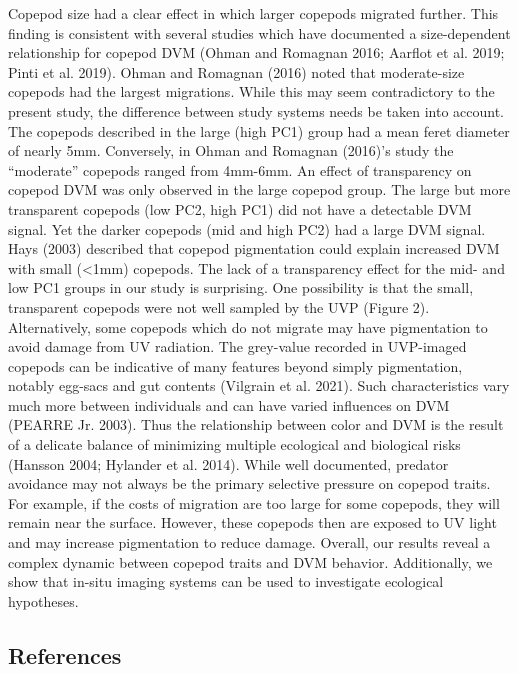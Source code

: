 \documentclass[
  letterpaper,
  DIV=11,
  numbers=noendperiod]{scrartcl}
\begin{document}
Copepod size had a clear effect in which larger copepods migrated
further. This finding is consistent with several studies which have
documented a size-dependent relationship for copepod DVM (Ohman and
Romagnan 2016; Aarflot et al. 2019; Pinti et al. 2019). Ohman and
Romagnan (2016) noted that moderate-size copepods had the largest
migrations. While this may seem contradictory to the present study, the
difference between study systems needs be taken into account. The
copepods described in the large (high PC1) group had a mean feret
diameter of nearly 5mm. Conversely, in Ohman and Romagnan (2016)'s study
the ``moderate'' copepods ranged from 4mm-6mm. An effect of transparency
on copepod DVM was only observed in the large copepod group. The large
but more transparent copepods (low PC2, high PC1) did not have a
detectable DVM signal. Yet the darker copepods (mid and high PC2) had a
large DVM signal. Hays (2003) described that copepod pigmentation could
explain increased DVM with small (\textless1mm) copepods. The lack of a
transparency effect for the mid- and low PC1 groups in our study is
surprising. One possibility is that the small, transparent copepods were
not well sampled by the UVP (Figure 2). Alternatively, some copepods
which do not migrate may have pigmentation to avoid damage from UV
radiation. The grey-value recorded in UVP-imaged copepods can be
indicative of many features beyond simply pigmentation, notably egg-sacs
and gut contents (Vilgrain et al. 2021). Such characteristics vary much
more between individuals and can have varied influences on DVM (PEARRE
Jr. 2003). Thus the relationship between color and DVM is the result of
a delicate balance of minimizing multiple ecological and biological
risks (Hansson 2004; Hylander et al. 2014). While well documented,
predator avoidance may not always be the primary selective pressure on
copepod traits. For example, if the costs of migration are too large for
some copepods, they will remain near the surface. However, these
copepods then are exposed to UV light and may increase pigmentation to
reduce damage. Overall, our results reveal a complex dynamic between
copepod traits and DVM behavior. Additionally, we show that in-situ
imaging systems can be used to investigate ecological hypotheses.

\hypertarget{sec-references}{%
\subsection*{References}\label{sec-references}}
\end{document}
